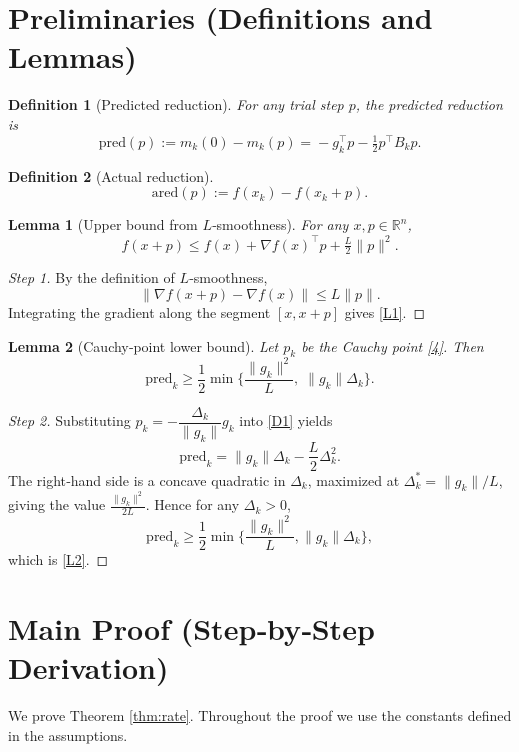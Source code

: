 \documentclass{article}
\newtheorem{lemma}{Lemma}
\newtheorem{definition}{Definition}
\newcommand{\R}{\mathbb{R}}
\begin{document}
\section*{Preliminaries (Definitions and Lemmas)}
\begin{definition}[Predicted reduction]
For any trial step $p$, the predicted reduction is
\[
\text{pred}(p):=m_{k}(0)-m_{k}(p)
=\!-g_{k}^{\top}p-\tfrac12 p^{\top}B_{k}p .
\tag{D1}
\]
\end{definition}
\begin{definition}[Actual reduction]
\[
\text{ared}(p):=f(x_{k})-f(x_{k}+p).
\tag{D2}
\]
\end{definition}
\begin{lemma}[Upper bound from $L$‑smoothness]\label{lem:smooth}
For any $x,p\in\R^{n}$,
\[
f(x+p)\le f(x)+\nabla f(x)^{\top}p+\tfrac{L}{2}\|p\|^{2}.
\tag{L1}
\]
\end{lemma}
\begin{proof}
[Step 1] By the definition of $L$‑smoothness,
\[
\|\nabla f(x+p)-\nabla f(x)\|\le L\|p\|.
\]
Integrating the gradient along the segment $[x,x+p]$ gives \eqref{L1}.
\end{proof}
\begin{lemma}[Cauchy‑point lower bound]\label{lem:cauchy}
Let $p_{k}$ be the Cauchy point \eqref{4}.  Then
\[
\text{pred}_{k}\ge
\frac12\min\!\Big\{\frac{\|g_{k}\|^{2}}{L},\;\|g_{k}\|\Delta_{k}\Big\}.
\tag{L2}
\]
\end{lemma}
\begin{proof}
[Step 2] Substituting $p_{k}= -\dfrac{\Delta_{k}}{\|g_{k}\|}g_{k}$ into \eqref{D1} yields
\[
\text{pred}_{k}= \|g_{k}\|\Delta_{k}
-\frac{L}{2}\Delta_{k}^{2}.
\]
The right‑hand side is a concave quadratic in $\Delta_{k}$,
maximized at $\Delta_{k}^{*}= \|g_{k}\|/L$, giving the value
$\frac{\|g_{k}\|^{2}}{2L}$.  Hence for any $\Delta_{k}>0$,
\[
\text{pred}_{k}\ge\frac12\min\!\Big\{\frac{\|g_{k}\|^{2}}{L},
\|g_{k}\|\Delta_{k}\Big\},
\]
which is \eqref{L2}.
\end{proof}

\section*{Main Proof (Step‑by‑Step Derivation)}
We prove Theorem \ref{thm:rate}.  Throughout the proof we use the
constants defined in the assumptions.
\end{document}
